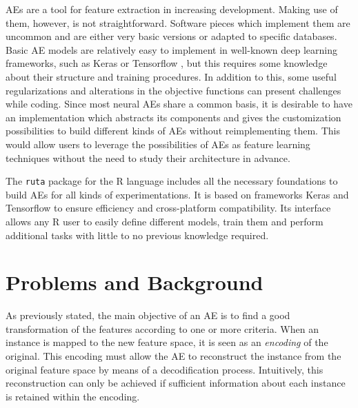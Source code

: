 \documentclass[
	fontsize=11pt, %
	twoside=false, %
	open=any, %
	secnumdepth=1, %
]{kaobook}
\newcommand{\revised}[1]{#1}
\newcommand{\revisedtwo}[1]{#1}
\begin{document}
AEs are a tool for feature extraction in increasing development. \revisedtwo{Making use of them, however, is not straightforward.} Software pieces which implement them are uncommon and are either very basic versions or adapted to specific databases. \revised{Basic AE models are relatively easy to implement in well-known deep learning frameworks, such as Keras \cite{Keras} or Tensorflow \cite{Tensorflow}\revisedtwo{, but this requires some knowledge about their structure and training procedures. In addition to this}, some useful regularizations and alterations in the objective functions can present challenges while coding.} Since most neural AEs share a common basis, it is desirable to have an implementation which abstracts its components and gives the customization possibilities to build different kinds of AEs without reimplementing them. \revisedtwo{This would allow users to leverage the possibilities of AEs as feature learning techniques without the need to study their architecture in advance.}

The \texttt{ruta} package for the R language includes all the necessary foundations to build AEs for all kinds of experimentations. It is based on frameworks Keras and Tensorflow to ensure efficiency and cross-platform compatibility. \revised{Its interface allows any R user to easily define different models, train them and perform additional tasks with little to no previous knowledge required.}




\section{Problems and Background}
\label{sec.background}


As previously stated, the main objective of an AE is to find a good transformation of the features according to one or more criteria. When an instance is mapped to the new feature space, it is seen as an \emph{encoding} of the original. This encoding must allow the AE to reconstruct the instance from the original feature space by means of a decodification process. Intuitively, this reconstruction can only be achieved if sufficient information about each instance is retained within the encoding.
\end{document}
